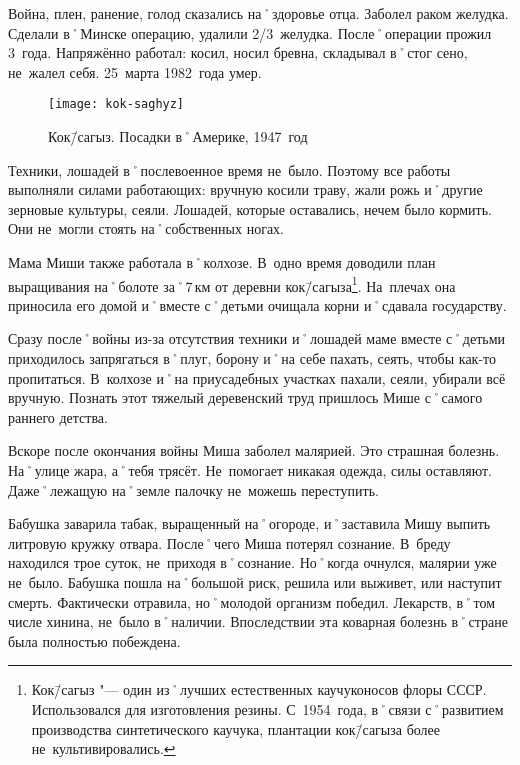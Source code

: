 Война, плен, ранение, голод сказались на˚здоровье отца. Заболел раком желудка. Сделали в˚Минске операцию, удалили 2/3~желудка. После˚операции прожил 3~года. Напряжённо работал: косил, носил бревна, складывал в˚стог сено, не~жалел себя. 25~марта 1982~года умер.

\begin{wrapfigure}{O}{.4\textwidth}
\centering
\texttt{[image: kok-saghyz]}
\caption[Кок\=/сагыз. Посадки в˚Америке, 1947~год]{Кок\=/сагыз. Посадки в˚Америке, 1947~год\footnotemark}
\label{fig:kok-saghyz}
\end{wrapfigure}

Техники, лошадей в˚послевоенное время не~было. Поэтому все работы выполняли силами работающих: вручную косили траву, жали рожь и˚другие зерновые культуры, сеяли. Лошадей, которые оставались, нечем было кормить. Они не~могли стоять на˚собственных ногах.

Мама Миши также работала в˚колхозе. В~одно время доводили план выращивания на˚болоте за˚7\,км от деревни кок\=/сагыза\footnote{Кок\=/сагыз "--- один из˚лучших естественных каучуконосов флоры СССР. Использовался для изготовления резины. С~1954~года, в˚связи с˚развитием производства синтетического каучука, плантации кок\=/сагыза более не~культивировались.}. На~плечах она приносила его домой и˚вместе с˚детьми очищала корни и˚сдавала государству.

Сразу после˚войны из-за отсутствия техники и˚лошадей маме вместе с˚детьми приходилось запрягаться в˚плуг, борону и˚на себе пахать, сеять, чтобы как-то пропитаться. В~колхозе и˚на приусадебных участках пахали, сеяли, убирали всё вручную. Познать этот тяжелый деревенский труд пришлось  Мише с˚самого раннего детства.

Вскоре после окончания войны Миша заболел малярией. Это страшная болезнь. На˚улице жара, а˚тебя трясёт. Не~помогает никакая одежда, силы оставляют. Даже˚лежащую на˚земле палочку не~можешь переступить. 

Бабушка заварила табак, выращенный на˚огороде, и˚заставила Мишу выпить литровую кружку отвара. После˚чего Миша потерял сознание. В~бреду находился трое суток, не~приходя в˚сознание. Но˚когда очнулся, малярии уже не~было. Бабушка пошла на˚большой риск, решила или выживет, или наступит смерть. Фактически отравила, но˚молодой организм победил. Лекарств, в˚том числе хинина, не~было в˚наличии. Впоследствии эта коварная болезнь в˚стране была полностью побеждена.

